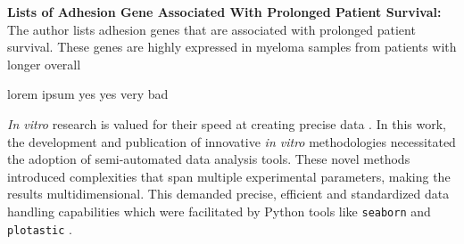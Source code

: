 \textbf{Lists of Adhesion Gene Associated With Prolonged Patient Survival:}
The author lists adhesion genes that are associated with prolonged patient
survival. These genes are highly expressed in myeloma samples from patients with
longer overall



%
\label{sec:discussion_conclusion_cancer}%

lorem ipsum yes yes very bad












%
\label{sec:discussion_semi_automated_analysis}%
\textit{In vitro} research is valued for their speed at creating precise data
\cite{moleiroCriticalAnalysisAvailable2017}. In this work, the development and
publication of innovative \textit{in vitro} methodologies necessitated the adoption of
semi-automated data analysis tools. These novel methods introduced complexities
that span multiple experimental parameters, making the results multidimensional.
This demanded precise, efficient and standardized data handling capabilities
which were facilitated by Python tools like \texttt{seaborn} and
\texttt{plotastic} \cite{waskomSeabornStatisticalData2021,kuricPlotasticBridgingPlotting2024}.


